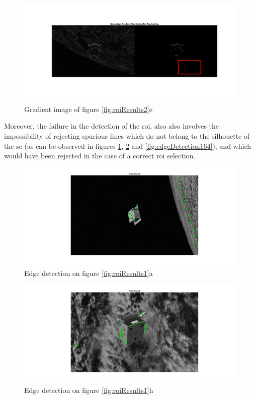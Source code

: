 \begin{figure}[htbp]
  \centering
  \includegraphics[width=1.0\textwidth]{gfx/results/prisma/164/8Select.png}
  \caption{Gradient image of figure \ref{fig:roiResults2}e}
\end{figure}

Moreover, the failure in the detection of the \acrshort{roi}, also also involves
the impossibility of rejecting spurious lines which do not belong to the silhouette of the \acrshort{sc} (as can be observed in figures \ref{fig:edgeDetection101}, \ref{fig:edgeDetection117} and \ref{fig:edgeDetection164}), and which would have been rejected in the case of a correct \acrshort{roi} selection.

\begin{figure}[htbp]
  \centering
  \includegraphics[width=1.0\textwidth]{gfx/results/prisma/101/15.png}
  \caption{Edge detection on figure \ref{fig:roiResults1}a}
  \label{fig:edgeDetection101}
\end{figure}

\begin{figure}[htbp]
  \centering
  \includegraphics[width=1.0\textwidth]{gfx/results/prisma/117/15.png}
  \caption{Edge detection on figure \ref{fig:roiResults1}h}
  \label{fig:edgeDetection117}
\end{figure}

